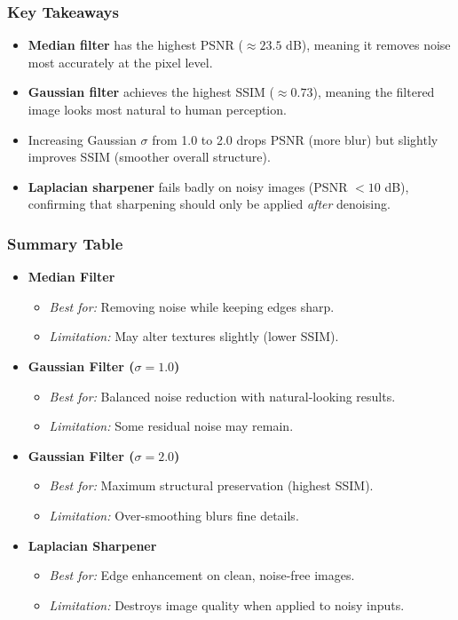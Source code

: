 \documentclass[a4paper,12pt]{article}
\begin{document}
\subsubsection*{Key Takeaways}

\begin{itemize}
    \item \textbf{Median filter} has the highest PSNR ($\approx 23.5$ dB), meaning it removes noise most accurately at the pixel level.
    \item \textbf{Gaussian filter} achieves the highest SSIM ($\approx 0.73$), meaning the filtered image looks most natural to human perception.
    \item Increasing Gaussian $\sigma$ from 1.0 to 2.0 drops PSNR (more blur) but slightly improves SSIM (smoother overall structure).
    \item \textbf{Laplacian sharpener} fails badly on noisy images (PSNR $< 10$ dB), confirming that sharpening should only be applied \textit{after} denoising.
\end{itemize}

\subsubsection*{Summary Table}

\begin{itemize}
    \item \textbf{Median Filter}
    \begin{itemize}
        \item \textit{Best for:} Removing noise while keeping edges sharp.
        \item \textit{Limitation:} May alter textures slightly (lower SSIM).
    \end{itemize}

    \item \textbf{Gaussian Filter ($\sigma=1.0$)}
    \begin{itemize}
        \item \textit{Best for:} Balanced noise reduction with natural-looking results.
        \item \textit{Limitation:} Some residual noise may remain.
    \end{itemize}

    \item \textbf{Gaussian Filter ($\sigma=2.0$)}
    \begin{itemize}
        \item \textit{Best for:} Maximum structural preservation (highest SSIM).
        \item \textit{Limitation:} Over-smoothing blurs fine details.
    \end{itemize}

    \item \textbf{Laplacian Sharpener}
    \begin{itemize}
        \item \textit{Best for:} Edge enhancement on clean, noise-free images.
        \item \textit{Limitation:} Destroys image quality when applied to noisy inputs.
    \end{itemize}
\end{itemize}
\end{document}
